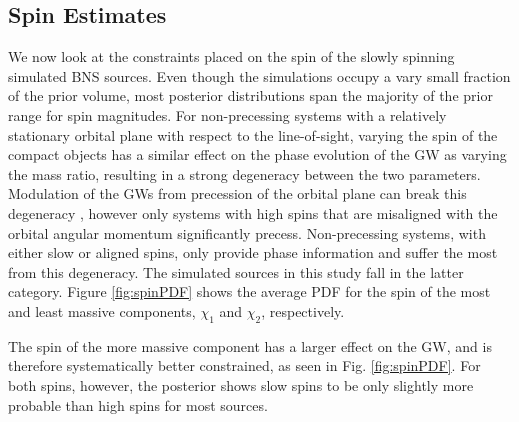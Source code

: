 \subsection{Spin Estimates}\label{sec:spin-magnitudes}
We now look at the constraints placed on the spin of the slowly spinning simulated BNS sources.  Even though the simulations occupy a vary small fraction of the prior volume, most posterior distributions span the majority of the prior range for spin magnitudes. For non-precessing systems with a relatively stationary orbital plane with respect to the line-of-sight, varying the spin of the compact objects has a similar effect on the phase evolution of the GW as varying the mass ratio, resulting in a strong degeneracy between the two parameters.  Modulation of the GWs from precession of the orbital plane can break this degeneracy \citep{Vecchio_2004,Lang_2006,Vitale_2014,Chatziioannou_2014}, however only systems with high spins that are misaligned with the orbital angular momentum significantly precess. Non-precessing systems, with either slow or aligned spins, only provide phase information and suffer the most from this degeneracy.  The simulated sources in this study fall in the latter category.  Figure \ref{fig:spinPDF} shows the average PDF for the spin of the most and least massive components, $\chi_1$ and $\chi_2$, respectively.

The spin of the more massive component has a larger effect on the GW, and is therefore systematically better constrained, as seen in Fig. \ref{fig:spinPDF}.  For both spins, however, the posterior shows slow spins to be only slightly more probable than high spins for most sources.
  
  
  